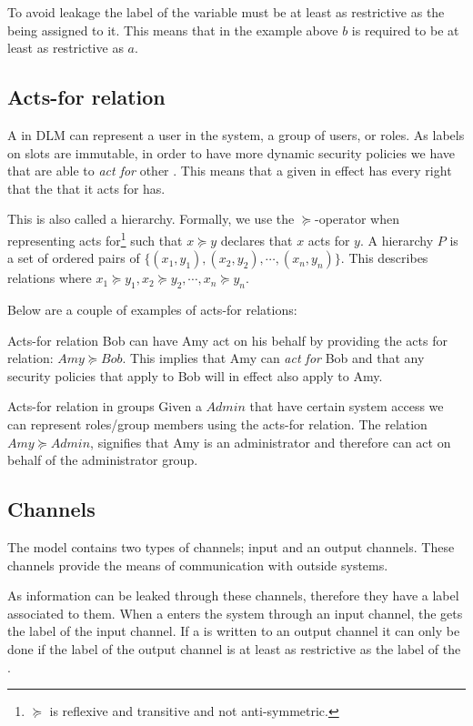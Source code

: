 To avoid leakage the label of the variable must be at least as restrictive as the \xvalue{} being assigned to it.
This means that in the example above $b$ is required to be at least as restrictive as $a$.

\subsection{Acts-for relation}
A \principal{} in DLM can represent a user in the system, a group of users, or roles.
As labels on slots are immutable, in order to have more dynamic security policies we have that \principals{} are able to \textit{act for} other \principals{}.
This means that a given \principal{} in effect has every right that the \principal{} that it acts for has.

This is also called a \principal{} hierarchy.
Formally, we use the $\succeq$-operator when representing acts for\footnote{$\succeq$ is reflexive and transitive and not anti-symmetric.} such that $x \succeq y$ declares that $x$ acts for $y$.
A \principal{} hierarchy $P$ is a set of ordered pairs of \principals{} $\{(x_1, y_1), (x_2, y_2), \cdots, (x_n, y_n)\}$.
This describes relations where $x_1 \succeq y_1, x_2 \succeq y_2, \cdots, x_n \succeq y_n$.

Below are a couple of examples of acts-for relations:
\begin{example}{Acts-for relation}
  Bob can have Amy act on his behalf by providing the acts for relation: $Amy \succeq Bob$.
  This implies that Amy can \textit{act for} Bob and that any security policies that apply to Bob will in effect also apply to Amy.
\end{example}

\begin{example}{Acts-for relation in groups}
  Given a \principal{} $Admin$ that have certain system access we can represent roles/group members using the acts-for relation.
  The relation $Amy \succeq Admin$, signifies that Amy is an administrator and therefore can act on behalf of the administrator group. 
\end{example}

\subsection{Channels}
The model contains two types of channels; input and an output channels.
These channels provide the means of communication with outside systems.

As information can be leaked through these channels, therefore they have a label associated to them.
When a \xvalue{} enters the system through an input channel, the \xvalue{} gets the label of the input channel.
If a \xvalue{} is written to an output channel it can only be done if the label of the output channel is at least as restrictive as the label of the \xvalue{}.

